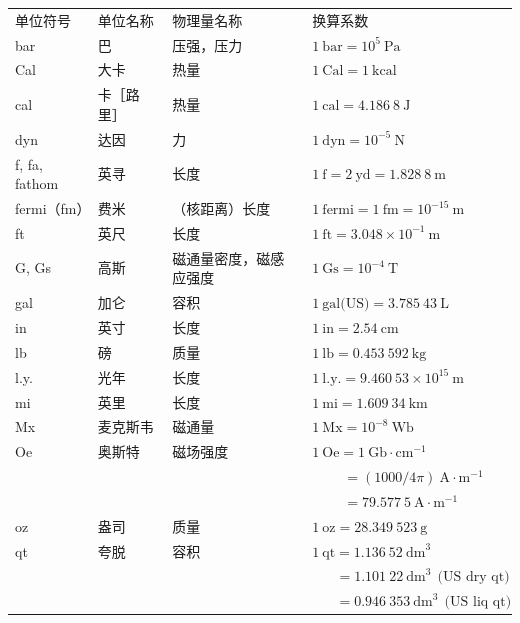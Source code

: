 \documentclass[UTF8, 12pt, a4paper, twoside]{ctexbook}
\begin{document}
\vspace{10pt}
\begin{table}[!ht]
    \centering
    \renewcommand\arraystretch{1.4}
    \begin{tabularx}{\textwidth}{llll}
        单位符号 & 单位名称 & 物理量名称 & 换算系数 \\ 
        bar & 巴 & 压强，压力 & $1~\text{bar}=10^5~\text{Pa}$ \\ 
        Cal & 大卡 & 热量 & $1~\text{Cal}=1~\text{kcal}$ \\ 
        cal & 卡［路里］ & 热量 & $1~\text{cal}=4.186~8~\text{J}$ \\ 
        dyn & 达因 & 力 & $1~\text{dyn}=10^{-5}~\text{N}$ \\ 
        f, fa, fathom & 英寻 & 长度 & $1~\text{f}=2~\text{yd}=1.828~8~\text{m}$ \\ 
        fermi（fm） & 费米 & （核距离）长度 & $1~\text{fermi}=1~\text{fm}=10^{-15}~\text{m}$ \\ 
        ft & 英尺 & 长度 & $1~\text{ft}=3.048\times10^{-1}~\text{m}$ \\ 
        G, Gs & 高斯 & 磁通量密度，磁感应强度 & $1~\text{Gs}=10^{-4}~\text{T}$ \\ 
        gal & 加仑 & 容积 & $1~\text{gal(US)}=3.785~43~\text{L}$ \\ 
        in & 英寸 & 长度 & $1~\text{in}=2.54~\text{cm}$ \\ 
        lb & 磅 & 质量 & $1~\text{lb}=0.453~592~\text{kg}$ \\ 
        l.y. & 光年 & 长度 & $1~\text{l.y.}=9.460~53\times10^{15}~\text{m}$ \\ 
        mi & 英里 & 长度 & $1~\text{mi}=1.609~34~\text{km}$ \\ 
        Mx & 麦克斯韦 & 磁通量 & $1~\text{Mx}=10^{-8}~\text{Wb}$ \\ 
        Oe & 奥斯特 & 磁场强度 & $1~\text{Oe}=1~\text{Gb}\cdot\text{cm}^{-1}$ \\ 
        ~ & ~ & ~ & $\quad\quad~ =(1 000/4\pi)~\text{A}\cdot\text{m}^{-1}$ \\ 
        ~ & ~ & ~ & $\quad\quad~ =79.577~5~\text{A}\cdot\text{m}^{-1}$ \\ 
        oz & 盎司 & 质量 & $1~\text{oz}=28.349~523~\text{g}$ \\ 
        qt & 夸脱 & 容积 & $1~\text{qt}=1.136~52~\text{dm}^3$ \\ 
        ~ & ~ & ~ & $\quad~~~ =1.101~22~\text{dm}^3~~\text{(US dry qt)}$\\
        ~ & ~ & ~ & $\quad~~~ =0.946~353~\text{dm}^3~~\text{(US liq qt)}$\\
    \end{tabularx}
\end{table}
\end{document}
